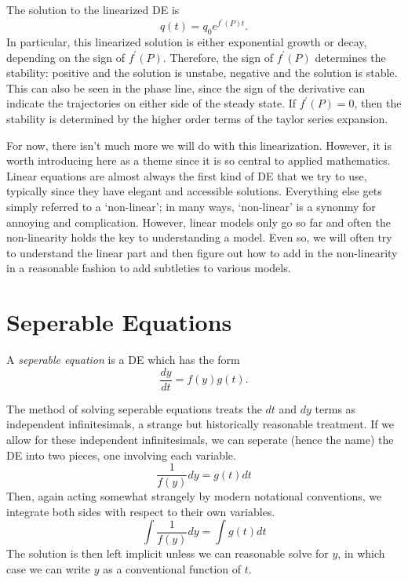 \documentclass[fleqn,letterpaper]{report}
\begin{document}
The solution to the linearized DE is 
\begin{equation*}
q(t) = q_0 e^{f^\prime(P) t}.
\end{equation*}
In particular, this linearized solution is either
exponential growth or decay, depending on the sign of
$f^\prime(P)$. Therefore, the sign of $f^\prime(P)$
determines the stability: positive and the solution is
unstabe, negative and the solution is stable. This can also
be seen in the phase line, since the sign of the derivative
can indicate the trajectories on either side of the steady
state. If $f^\prime(P) = 0$, then the stability is determined
by the higher order terms of the taylor series expansion.

For now, there isn't much more we will do with this
linearization. However, it is worth introducing here as a
theme since it is so central to applied mathematics. Linear
equations are almost always the first kind of DE that we try
to use, typically since they have elegant and accessible
solutions. Everything else gets simply referred to a
`non-linear'; in many ways, `non-linear' is a synonmy for
annoying and complication. However, linear models only go so
far and often the non-linearity holds the key to understanding
a model. Even so, we will often try to understand the
linear part and then figure out how to add in the
non-linearity in a reasonable fashion to add subtleties to
various models. 

\section{Seperable Equations}
\label{seperable-des}

\begin{defn}
A \emph{seperable equation} is a DE which has the form 
\begin{equation*}
\frac{dy}{dt} = f(y) g(t).
\end{equation*}
\end{defn}

The method of solving seperable equations treats the $dt$ and
$dy$ terms as independent infinitesimals, a strange but
historically reasonable treatment. If we allow for these
independent infinitesimals, we can seperate (hence the name)
the DE into two pieces, one involving each variable.
\begin{equation*}
\frac{1}{f(y)} dy = g(t) dt 
\end{equation*}
Then, again acting somewhat strangely by modern notational
conventions, we integrate both sides with respect to their own
variables.
\begin{equation*}
\int \frac{1}{f(y)} dy = \int g(t) dt
\end{equation*}
The solution is then left implicit unless we can reasonable
solve for $y$, in which case we can write $y$ as a
conventional function of $t$.
\end{document}
